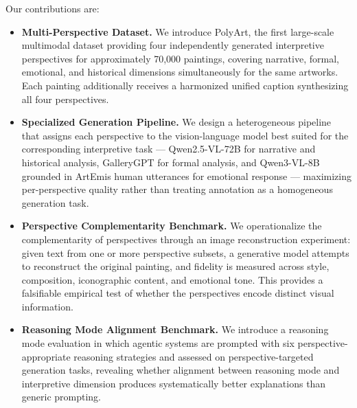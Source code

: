 \noindent Our contributions are:
\begin{itemize}
    \item \textbf{Multi-Perspective Dataset.} We introduce PolyArt, the first large-scale multimodal dataset providing four independently generated interpretive perspectives for approximately 70,000 paintings, covering narrative, formal, emotional, and historical dimensions simultaneously for the same artworks. Each painting additionally receives a harmonized unified caption synthesizing all four perspectives.

    \item \textbf{Specialized Generation Pipeline.} We design a heterogeneous pipeline that assigns each perspective to the vision-language model best suited for the corresponding interpretive task --- Qwen2.5-VL-72B for narrative and historical analysis, GalleryGPT for formal analysis, and Qwen3-VL-8B grounded in ArtEmis human utterances for emotional response --- maximizing per-perspective quality rather than treating annotation as a homogeneous generation task.

    \item \textbf{Perspective Complementarity Benchmark.} We operationalize the complementarity of perspectives through an image reconstruction experiment: given text from one or more perspective subsets, a generative model attempts to reconstruct the original painting, and fidelity is measured across style, composition, iconographic content, and emotional tone. This provides a falsifiable empirical test of whether the perspectives encode distinct visual information.

    \item \textbf{Reasoning Mode Alignment Benchmark.} We introduce a reasoning mode evaluation in which agentic systems are prompted with six perspective-appropriate reasoning strategies and assessed on perspective-targeted generation tasks, revealing whether alignment between reasoning mode and interpretive dimension produces systematically better explanations than generic prompting.
\end{itemize}